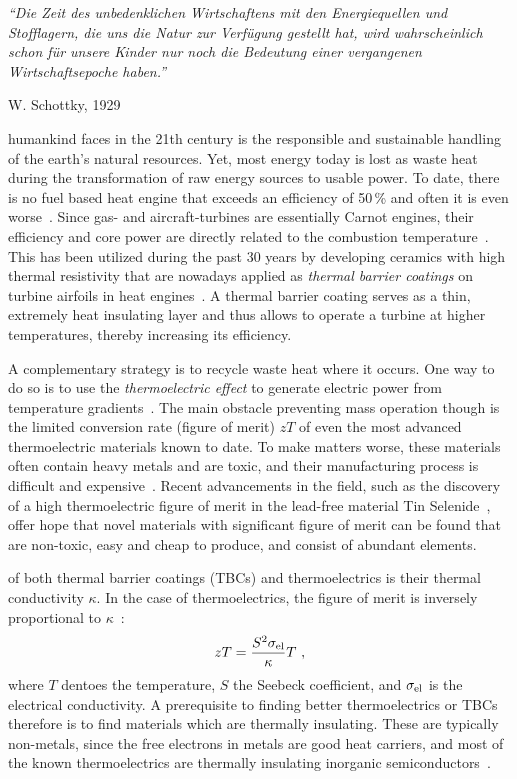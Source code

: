 \epigraph{\singlespacing \it ``Die Zeit des unbedenklichen Wirtschaftens mit den Energiequellen und Stofflagern, die uns die Natur zur Verfügung gestellt hat, wird wahrscheinlich schon für unsere Kinder nur noch die Bedeutung einer vergangenen Wirtschaftsepoche haben.''}{W. Schottky, 1929~\cite{Schottky1929}}
 humankind faces in the 21th century is the responsible and sustainable handling of the earth's natural resources.  Yet, most energy today is lost as waste heat during the transformation of raw energy sources to usable power. To date, there is no fuel based heat engine that exceeds an efficiency of 50\,\% and often it is even worse~\cite{eia}. 
Since gas- and aircraft-turbines are essentially Carnot engines, their efficiency and core power are directly related to the combustion temperature~\cite{Clarke2012,Perepezko2009}. This has been utilized during the past 30 years by developing 
ceramics with high thermal resistivity that are nowadays applied as \emph{thermal barrier coatings} on turbine airfoils in heat engines~\cite{Clarke2003}. A thermal barrier coating serves as a thin, extremely heat insulating layer and thus allows to operate a turbine at higher temperatures, thereby increasing its efficiency.

A complementary strategy is to recycle waste heat where it occurs. One way to do so is to use the
\emph{thermoelectric effect} to  generate electric power from temperature gradients~\cite{Snyder2008}. The main obstacle preventing mass operation though is the limited conversion rate (figure of merit) $zT$ of even the most advanced thermoelectric materials known to date. To make matters worse, these materials often contain heavy metals and are toxic, and their manufacturing process is difficult and expensive~\cite{Nolas2001}. Recent advancements in the field, such as the discovery of a high thermoelectric figure of merit in the lead-free material Tin Selenide~\cite{zhao2014}, offer hope that novel materials with significant figure of merit can be found that are non-toxic, easy and cheap to produce, and consist of abundant elements.

 of both thermal barrier coatings (TBCs) and thermoelectrics is their thermal conductivity $\kappa$. In the case of thermoelectrics, the figure of merit is inversely proportional to $\kappa$~\cite{Nolas2001}:
\begin{align}
zT = \frac{S^2 \sigma_{\rm el}}{\kappa} T~,
\label{eq:zT}
\end{align} 
where $T$ dentoes the temperature, $S$ the Seebeck coefficient, and $\sigma_{\rm el}$ is the electrical conductivity.
A prerequisite to finding better thermoelectrics or TBCs therefore is to find materials which are thermally insulating. These are typically non-metals, since the free electrons in metals are good heat carriers, and most of the known thermoelectrics are thermally insulating inorganic semiconductors~\cite[p.\,15]{Nolas2001}.


